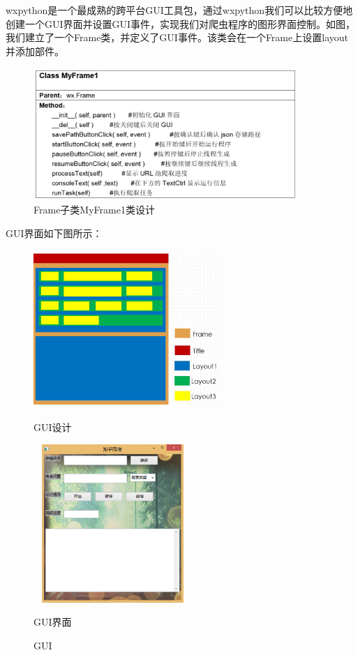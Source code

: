 \documentclass[UTF-8,a4paper, 12pt]{article}
\numberwithin{equation}{section}
\begin{document}
wxpython是一个最成熟的跨平台GUI工具包，通过wxpython我们可以比较方便地创建一个GUI界面并设置GUI事件，实现我们对爬虫程序的图形界面控制。如图，我们建立了一个Frame类，并定义了GUI事件。该类会在一个Frame上设置layout并添加部件。
\begin{figure}[!htbp]
  \centering
  \includegraphics[width=10cm,height=5cm]{Myframe}
  \caption{Frame子类MyFrame1类设计}\label{Myframe}
\end{figure}
GUI界面如下图所示：
\begin{figure}[!htbp]
  \centering
  \begin{minipage}[t]{7.5cm}
    \centering
    \includegraphics[width=7cm,height=6cm]{GUI设计}
    \centerline{\footnotesize{GUI设计}}
  \end{minipage}
  \begin{minipage}[t]{7.5cm}
    \centering
    \includegraphics[width=6cm,height=6cm]{GUI界面}
    \centerline{\footnotesize{GUI界面}}
  \end{minipage}
  \caption{GUI}
\end{figure}
\end{document}
